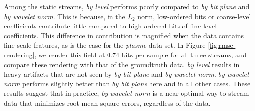 Among the static streams, \emph{by level} performs poorly compared to \emph{by bit plane} and
\emph{by wavelet norm}. This is because, in the $L_2$ norm, low-ordered bits or coarse-level
coefficients contribute little compared to high-ordered bits of fine-level coefficients. This
difference in contribution is magnified when the data contains fine-scale features, as is the case
for the \emph{plasma} data set. In Figure \ref{fig:rmse-rendering}, we render this field at 0.74
bits per sample for all three streams, and compare these rendering with that of the groundtruth
data. \emph{by level} results in heavy artifacts that are not seen by \emph{by bit plane} and
\emph{by wavelet norm}. \emph{by wavelet norm} performs slightly better than \emph{by bit plane}
here and in all other cases. These results suggest that in practice, \emph{by wavelet norm} is a
near-optimal way to stream data that minimizes root-mean-square errors, regardless of the data.

